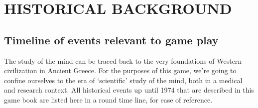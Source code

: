 \pagebreak 

\chapter{HISTORICAL BACKGROUND}
\label{historicalbackground}

\section{Timeline of events relevant to game play}
\label{timelineofeventsrelevanttogameplay}

The study of the mind can be traced back to the very foundations of Western civilization in Ancient Greece. For the purposes of this game, we’re going to confine ourselves to the era of ‘scientific’ study of the mind, both in a medical and research context. All historical events up until 1974 that are described in this game book are listed here in a round time line, for ease of reference.

